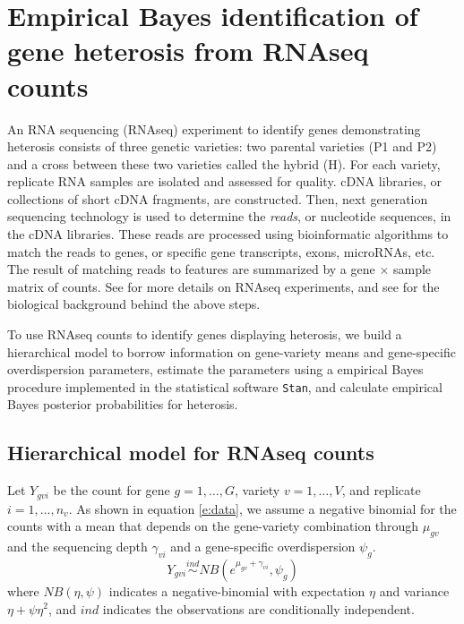 \documentclass[useAMS,usenatbib,referee]{biom}
\begin{document}
\section{Empirical Bayes identification of gene heterosis from RNAseq counts}
\label{s:method}

An RNA sequencing (RNAseq) experiment to identify genes demonstrating heterosis consists of three genetic varieties: two parental varieties (P1 and P2) and a cross between these two varieties called the hybrid (H). For each variety, replicate RNA samples are isolated and assessed for quality. cDNA libraries, or collections of short cDNA fragments, are constructed. Then, next generation sequencing technology is used to determine the \emph{reads}, or nucleotide sequences, in the cDNA libraries. These reads are processed using bioinformatic algorithms to match the reads to genes, or specific gene transcripts, exons, microRNAs, etc. The result of matching reads to features are summarized by a gene $\times$ sample matrix of counts. See \cite{nettleton2014design} for more details on RNAseq experiments, and see \cite{paschold2012complementation} for the biological background behind the above steps.

To use RNAseq counts to identify genes displaying heterosis, we build a hierarchical model to borrow information on gene-variety means and gene-specific overdispersion parameters, estimate the parameters using a empirical Bayes procedure implemented in the statistical software {\tt Stan}, and calculate empirical Bayes posterior probabilities for heterosis. 


\subsection{Hierarchical model for RNAseq counts}
\label{s:model}

Let $Y_{gvi}$ be the count for gene $g=1,\ldots,G$, variety $v=1,\ldots,V$, and replicate $i=1,\ldots,n_v$. As shown in equation \eqref{e:data}, we assume a negative binomial for the counts with a mean that depends on the gene-variety combination through $\mu_{gv}$ and the sequencing depth $\gamma_{vi}$ and a gene-specific overdispersion $\psi_g$. 
\begin{equation} 
Y_{gvi} \stackrel{ind}{\sim} NB(e^{\mu_{gv}+\gamma_{vi}},\psi_g) 
\label{e:data}
\end{equation}
where $NB(\eta,\psi)$ indicates a negative-binomial with expectation $\eta$ and variance $\eta+\psi\eta^2$, and $ind$ indicates the observations are conditionally independent.
\end{document}
